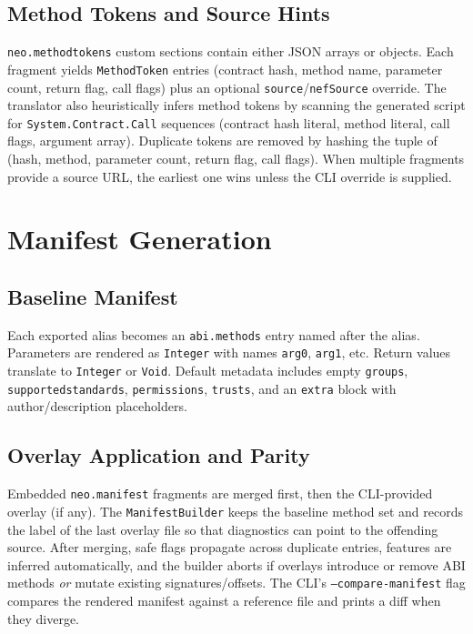 \documentclass[11pt]{article}
\begin{document}
\subsection{Method Tokens and Source Hints}
\texttt{neo.methodtokens} custom sections contain either JSON arrays or objects. Each fragment yields \texttt{MethodToken} entries (contract hash, method name, parameter count, return flag, call flags) plus an optional \texttt{source}/\texttt{nefSource} override. The translator also heuristically infers method tokens by scanning the generated script for \texttt{System.Contract.Call} sequences (contract hash literal, method literal, call flags, argument array). Duplicate tokens are removed by hashing the tuple of (hash, method, parameter count, return flag, call flags). When multiple fragments provide a source URL, the earliest one wins unless the CLI override is supplied.

\section{Manifest Generation}
\subsection{Baseline Manifest}
Each exported alias becomes an \texttt{abi.methods} entry named after the alias. Parameters are rendered as \texttt{Integer} with names \texttt{arg0}, \texttt{arg1}, etc. Return values translate to \texttt{Integer} or \texttt{Void}. Default metadata includes empty \texttt{groups}, \texttt{supportedstandards}, \texttt{permissions}, \texttt{trusts}, and an \texttt{extra} block with author/description placeholders.

\subsection{Overlay Application and Parity}
Embedded \texttt{neo.manifest} fragments are merged first, then the CLI-provided overlay (if any). The \texttt{ManifestBuilder} keeps the baseline method set and records the label of the last overlay file so that diagnostics can point to the offending source. After merging, safe flags propagate across duplicate entries, features are inferred automatically, and the builder aborts if overlays introduce or remove ABI methods \emph{or} mutate existing signatures/offsets. The CLI's \texttt{--compare-manifest} flag compares the rendered manifest against a reference file and prints a diff when they diverge.
\end{document}
